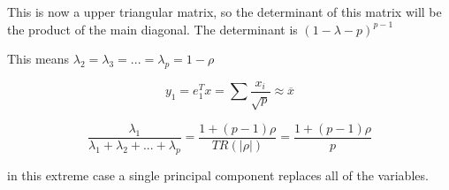 This is now a upper triangular matrix, so the determinant of this matrix will be the product of the main diagonal. The determinant is $(1-\lambda -p)^{p-1}$

This means $\lambda_2 = \lambda_3=...=\lambda_p = 1-\rho$

\[y_1=e_1^Tx=\displaystyle\sum \frac{x_i}{\sqrt{p}} \approx \overline{x}\]

\[\frac{\lambda_1}{\lambda_1+\lambda_2+...+\lambda_p}= \frac{1+(p-1)\rho}{TR(|\rho|)} = \frac{1+(p-1)\rho}{p}\]

in this extreme case a single principal component replaces all of the variables.